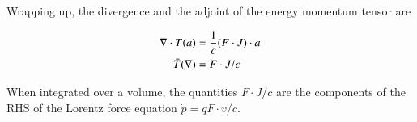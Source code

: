 Wrapping up, the divergence and the adjoint of the energy momentum tensor are

\begin{align}
\nabla \cdot T(a) &= \frac{1}{c} (F \cdot J) \cdot a \\
\bar{T}(\nabla) &= F \cdot J/c
\end{align}

When integrated over a volume, the quantities $F \cdot J/c$ are the components of the RHS of the Lorentz force equation $\dot{p} = q F \cdot v/c$.

\EndArticle

